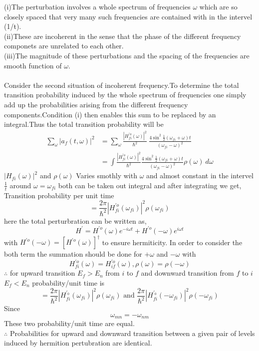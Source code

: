 (i)The perturbation involves a whole spectrum of frequencies $\omega$ which are so closely spaced that very many such frequencies are contained with in the intervel (1/t).\\
(ii)These are incoherent in the sense that the phase of the different frequency componets are unrelated to each other.\\
(iii)The magnitude of these perturbations and the spacing of the frequencies are smooth function of $\omega$.\\\\
Consider the second situation of incoherent frequency.To determine the total transition probability induced by the whole spectrum of frequencies one simply add up the probabilities arising from the different frequency components.Condition (i) then enables this sum to be replaced by an integral.Thus the total transition probability will be 
\begin{align*}
\sum_{\omega} |a_f(t,\omega)|^2 &= \sum_{\omega}  \frac{|H^{\prime o}_{fi}(\omega)|^2}{\hbar^2}\ \frac{4 \sin^2\frac{1}{2}(\omega_{fi}+\omega)t}{(\omega_{fi}-\omega)^2}\\
&=\int \frac{|H^{\prime o}_{fi}(\omega)|^2}{\hbar^2}\frac{4 \sin^2\frac{1}{2}(\omega_{fi}+\omega)t}{(\omega_{fi}-\omega)^2}\rho (\omega)\ d\omega
\end{align*}
$|H_{fi}(\omega)|^2$ and $\rho(\omega)$ Varies smothly with $\omega$ and almost constant in the intervel $\frac{1}{t}$ around $\omega=\omega_{fi}$ both can be taken out integral and after integrating we get,\\
Transition probability per unit time
$$  = \frac{2\pi}{\hbar^2}|H^{\prime o}_{fi}(\omega_{fi})|^2 \rho (\omega_{fi})$$
here the total perturbration can be written as,
$$H^\prime = H^{\prime o}(\omega)e^{-i\omega t}+ H^{\prime o}(-\omega)e^{i\omega t}$$
with $H^{\prime o}(-\omega)=[H^{\prime o}(\omega)]^\dagger$ to ensure hermiticity.
In order to consider the both term the summation should be done for $+\omega$ and $-\omega$ with
$$ H^{\prime o}_{fi}(\omega)=H^{\prime o}_{if}(\omega),\rho(\omega)=\rho(-\omega)$$
$\therefore$ for upward transition $E_f>E_n$ from $i$ to $f$ and downward transition from $f$ to $i$ $E_f<E_n$
probability/unit time is 
$$ =\frac{2\pi}{\hbar^2}|H^{\prime_0}_{fi}(\omega_{fi})|^2 \rho(\omega_{fi})\text{ and } \frac{2\pi}{\hbar^2}|H^{\prime_0}_{fi}(-\omega_{fi})|^2\rho(-\omega_{fi})$$
Since $$\omega_{mn}=-\omega_{nm}$$
These two probability/unit time are equal.\\
$\therefore$ Probabilities for upward and downward transition between a given pair of levels induced by hermition pertubration are identical.







